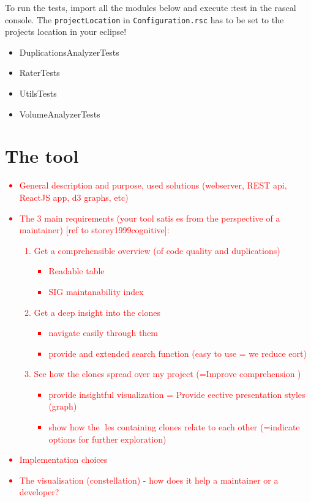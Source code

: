 \documentclass{uva-inf-article}
\newcommand\todo[1]{\textcolor{red}{#1}}
\begin{document}
To run the tests, import all the modules below and execute :test in the rascal console. The \texttt{projectLocation} in \texttt{Configuration.rsc} has to be set to the projects location in your eclipse!

\begin{itemize}

\item
  DuplicationsAnalyzerTests
\item
  RaterTests
\item
  UtilsTests
\item
  VolumeAnalyzerTests
\end{itemize}


\section{The tool}
\todo{
\begin{itemize}
\item{General description and purpose, used solutions (webserver, REST api, ReactJS app, d3 graphs, etc)}
\item{The 3 main requirements (your tool satises from the perspective of a maintainer) [ref to storey1999cognitive]:
  \begin{enumerate}
    \item{Get a comprehensible overview (of code quality and duplications) 
      \begin{itemize}
        \item{Readable table}
        \item{SIG maintanability index}
      \end{itemize}
      }
    \item{Get a deep insight into the clones 
      \begin{itemize}
        \item{navigate easily through them}
        \item{provide and extended search function (easy to use = we reduce eort)}
      \end{itemize}
     }
    \item{See how the clones spread over my project (=Improve comprehension ) 
      \begin{itemize}
        \item{provide insightful visualization = Provide eective presentation styles (graph)}
        \item{show how the les containing clones relate to each other (=indicate options for further exploration)}
      \end{itemize}
      }
  \end{enumerate}
}
\item{Implementation choices}
\item{The visualisation (constellation) - how does it help a maintainer or a developer?}
\end{itemize}
}
\end{document}
